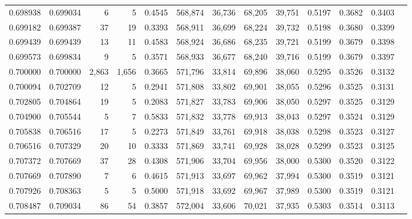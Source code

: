 \begin{tabular}{rrrrrrrrrrrrr}
0.698938 & 0.699034 &      6 &     5 &                                     0.4545 & 568,874 &  36,736 &  68,205 &  39,751 & 0.5197 & 0.3682 & 0.3403 \\
0.699182 & 0.699387 &     37 &    19 &                                     0.3393 & 568,911 &  36,699 &  68,224 &  39,732 & 0.5198 & 0.3680 & 0.3399 \\
0.699439 & 0.699439 &     13 &    11 &                                     0.4583 & 568,924 &  36,686 &  68,235 &  39,721 & 0.5199 & 0.3679 & 0.3398 \\
0.699573 & 0.699834 &      9 &     5 &                                     0.3571 & 568,933 &  36,677 &  68,240 &  39,716 & 0.5199 & 0.3679 & 0.3397 \\
0.700000 & 0.700000 &  2,863 & 1,656 &                                     0.3665 & 571,796 &  33,814 &  69,896 &  38,060 & 0.5295 & 0.3526 & 0.3132 \\
0.700094 & 0.702709 &     12 &     5 &                                     0.2941 & 571,808 &  33,802 &  69,901 &  38,055 & 0.5296 & 0.3525 & 0.3131 \\
0.702805 & 0.704864 &     19 &     5 &                                     0.2083 & 571,827 &  33,783 &  69,906 &  38,050 & 0.5297 & 0.3525 & 0.3129 \\
0.704900 & 0.705544 &      5 &     7 &                                     0.5833 & 571,832 &  33,778 &  69,913 &  38,043 & 0.5297 & 0.3524 & 0.3129 \\
0.705838 & 0.706516 &     17 &     5 &                                     0.2273 & 571,849 &  33,761 &  69,918 &  38,038 & 0.5298 & 0.3523 & 0.3127 \\
0.706516 & 0.707329 &     20 &    10 &                                     0.3333 & 571,869 &  33,741 &  69,928 &  38,028 & 0.5299 & 0.3523 & 0.3125 \\
0.707372 & 0.707669 &     37 &    28 &                                     0.4308 & 571,906 &  33,704 &  69,956 &  38,000 & 0.5300 & 0.3520 & 0.3122 \\
0.707669 & 0.707890 &      7 &     6 &                                     0.4615 & 571,913 &  33,697 &  69,962 &  37,994 & 0.5300 & 0.3519 & 0.3121 \\
0.707926 & 0.708363 &      5 &     5 &                                     0.5000 & 571,918 &  33,692 &  69,967 &  37,989 & 0.5300 & 0.3519 & 0.3121 \\
0.708487 & 0.709034 &     86 &    54 &                                     0.3857 & 572,004 &  33,606 &  70,021 &  37,935 & 0.5303 & 0.3514 & 0.3113 \\

\end{tabular}
